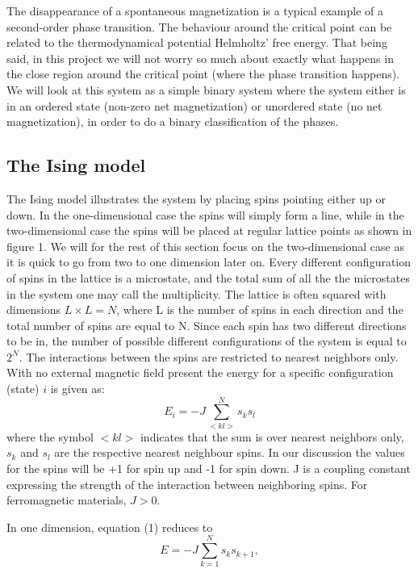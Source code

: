 \documentclass[a4paper,12pt]{article}
\begin{document}
The disappearance of a spontaneous magnetization is a typical example of a second-order phase transition. The behaviour around the critical point can be related to the thermodynamical potential Helmholtz' free energy. That being said, in this project we will not worry so much about exactly what happens in the close region around the critical point (where the phase transition happens). We will look at this system as a simple binary system where the system either is in an ordered state (non-zero net magnetization) or unordered state (no net magnetization), in order to do a binary classification of the phases.\newline

\subsection{The Ising model}
The Ising model illustrates the system by placing spins pointing either up or down. In the one-dimensional case the spins will simply form a line, while in the two-dimensional case the spins will be placed at regular lattice points as shown in figure 1. We will for the rest of this section focus on the two-dimensional case as it is quick to go from two to one dimension later on. Every different configuration of spins in the lattice is a microstate, and  the total sum of all the the microstates in the system one may call the multiplicity. The lattice is often squared with dimensions $L \times L = N$, where L is the number of spins in each direction and the total number of spins are equal to N. Since each spin has two different directions to be in, the number of possible different configurations of the system is equal to $2^N$. The interactions between the spins are restricted to nearest neighbors only.\newline
With no external magnetic field present the energy for a specific configuration (state) $i$ is given as:
\begin{equation}
    E_i = -J \sum_{<kl>}^{N} s_k s_l
\end{equation}
where the symbol $<kl>$ indicates that the sum is over nearest neighbors only, $s_k$ and $s_l$ are the respective nearest neighbour spins. In our discussion the values for the spins will be +1 for spin up and -1 for spin down. J is a coupling constant expressing the strength of the interaction between neighboring spins. For ferromagnetic materials, $J > 0$.\newline

In one dimension, equation (1) reduces to
\begin{equation}
    E = - J\sum_{k=1}^{N} s_k s_{k+1},
\end{equation}
\end{document}
